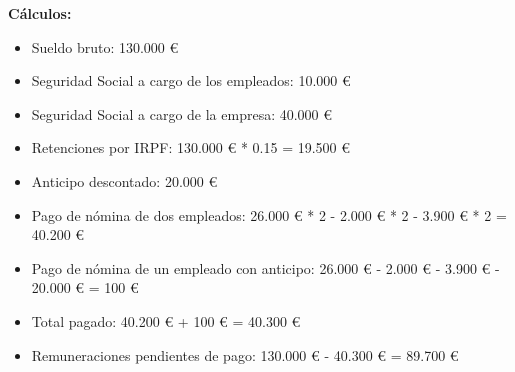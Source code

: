 \textbf{Cálculos:}
\begin{itemize}
    \item Sueldo bruto: 130.000 €
    \item Seguridad Social a cargo de los empleados: 10.000 €
    \item Seguridad Social a cargo de la empresa: 40.000 €
    \item Retenciones por IRPF: 130.000 € * 0.15 = 19.500 €
    \item Anticipo descontado: 20.000 €
    \item Pago de nómina de dos empleados: 26.000 € * 2 - 2.000 € * 2 - 3.900 € * 2 = 40.200 €
    \item Pago de nómina de un empleado con anticipo: 26.000 € - 2.000 € - 3.900 € - 20.000 € = 100 €
    \item Total pagado: 40.200 € + 100 € = 40.300 €
    \item Remuneraciones pendientes de pago: 130.000 € - 40.300 € = 89.700 €
\end{itemize}
